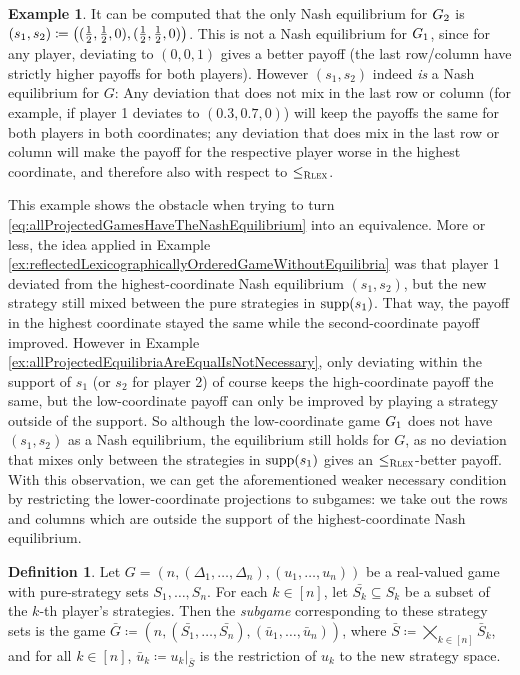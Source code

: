 \documentclass[a4paper]{scrreprt}
\theoremstyle{definition}
\newtheorem{defn}[thm]{Definition} %
\newtheorem{ex}[thm]{Example} %
\begin{document}
\begin{ex}
        It can be computed that the only Nash equilibrium for $G_{2}$ is $(s_1, s_2) \coloneqq \bigl((\frac{1}{2}, \frac{1}{2}, 0), (\frac{1}{2}, \frac{1}{2}, 0)\bigr)$.
        This is not a Nash equilibrium for $G_{1}$, since for any player, deviating to $(0, 0, 1)$ gives a better payoff (the last row/column have strictly higher payoffs for both players).
        However $(s_1, s_2)$ indeed \emph{is} a Nash equilibrium for $G$:
        Any deviation that does not mix in the last row or column (for example, if player 1 deviates to $(0.3, 0.7, 0)$) will keep the payoffs the same for both players in both coordinates; any deviation that does mix in the last row or column will make the payoff for the respective player worse in the highest coordinate, and therefore also with respect to $\leq_{\textsc{Rlex}}$.
    \end{ex}

    This example shows the obstacle when trying to turn \eqref{eq:allProjectedGamesHaveTheNashEquilibrium} into an equivalence.
    More or less, the idea applied in Example \ref{ex:reflectedLexicographicallyOrderedGameWithoutEquilibria} was that player 1 deviated from the highest-coordinate Nash equilibrium $(s_1, s_2)$, but the new strategy still mixed between the pure strategies in $\operatorname{supp}(s_1)$. That way, the payoff in the highest coordinate stayed the same while the second-coordinate payoff improved.
    However in Example \ref{ex:allProjectedEquilibriaAreEqualIsNotNecessary}, only deviating within the support of $s_1$ (or $s_2$ for player 2) of course keeps the high-coordinate payoff the same, but the low-coordinate payoff can only be improved by playing a strategy outside of the support.
    So although the low-coordinate game $G_{1}$ does not have $(s_1, s_2)$ as a Nash equilibrium, the equilibrium still holds for $G$, as no deviation that mixes only between the strategies in $\operatorname{supp}(s_1)$ gives an $\leq_{\textsc{Rlex}}$-better payoff.
    With this observation, we can get the aforementioned weaker necessary condition by restricting the lower-coordinate projections to subgames: we take out the rows and columns which are outside the support of the highest-coordinate Nash equilibrium.
    
    \begin{defn}
        Let $G = (n, (\Delta_1, \dots, \Delta_n), (u_1, \dots, u_n))$ be a real-valued game with pure-strategy sets $S_1, \dots, S_n$. For each $k \in [n]$, let $\bar{S_k} \subseteq S_k$ be a subset of the $k$-th player's strategies. Then the \emph{subgame} corresponding to these strategy sets is the game $\bar{G} \coloneqq (n, (\bar{S_1}, \dots, \bar{S_n}), (\bar{u}_1, \dots, \bar{u}_n))$, where $\bar{S} \coloneqq \bigtimes_{k \in [n]} \bar{S}_k$, and for all $k \in [n]$, $\bar{u}_k \coloneqq u_k\vert_{\bar{S}}$ is the restriction of $u_k$ to the new strategy space.
    \end{defn}
\end{document}
